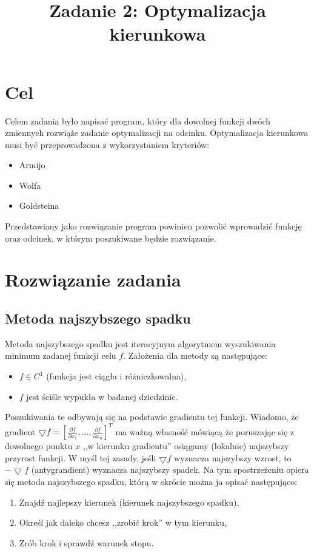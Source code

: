 \documentclass{classrep}
\author{
  \studentinfo{Paweł Musiał}{178726} \and
  \studentinfo{Łukasz Michalski}{178724}
}
\title{Zadanie 2: Optymalizacja kierunkowa}
\begin{document}
\maketitle

\addtocounter{footnote}{1}

\section{Cel}
Celem zadania było napisać program, który dla dowolnej funkcji dwóch zmiennych rozwiąże zadanie optymalizacji na odcinku. Optymalizacja kierunkowa musi być przeprowadzona z wykorzystaniem kryteriów:
\begin{itemize}
\item Armijo
\item Wolfa
\item Goldsteina
\end{itemize}
Przedstawiany jako rozwiązanie program powinien pozwolić wprowadzić funkcję oraz odcinek, w którym poszukiwane będzie rozwiązanie.

\section{Rozwiązanie zadania}
\subsection{Metoda najszybszego spadku}
Metoda najszybszego spadku jest iteracyjnym algorytmem wyszukiwania minimum zadanej funkcji celu $f$. Założenia dla metody są następujące:
\begin{itemize}
\item $f\in C^1$ (funkcja jest ciągła i różniczkowalna),
\item $f$ jest ściśle wypukła w badanej dziedzinie.
\end{itemize}
Poszukiwania te odbywają się na podstawie gradientu tej funkcji. Wiadomo, że gradient $\bigtriangledown f=[\frac{\partial f}{\partial x_{1}},...,\frac{\partial f}{\partial x_{n}}]^T$ ma ważną własność mówiącą że poruszając się z dowolnego punktu $x$ ,,w kierunku gradientu'' osiągamy (lokalnie) najszybszy przyrost funkcji. W myśl tej zasady, jeśli $\bigtriangledown f$ wyznacza najszybszy wzrost, to $-\bigtriangledown f$ (antygrandient) wyznacza najszybszy spadek. Na tym spostrzeżeniu opiera się metoda najszybszego spadku, którą w skrócie można ja opisać następująco:
\begin{enumerate}
\item Znajdź najlepszy kierunek (kierunek najszybszego spadku),
\item Określ jak daleko chcesz ,,zrobić krok'' w tym kierunku,
\item Zrób krok i sprawdź warunek stopu.
\end{enumerate}
\end{document}
